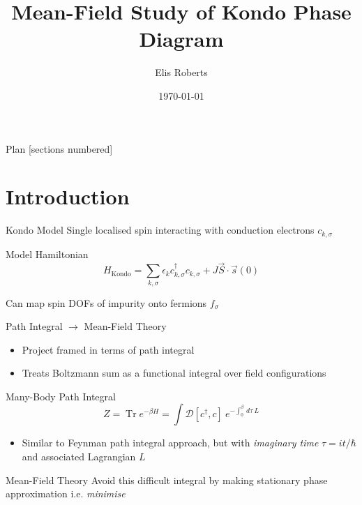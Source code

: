 \documentclass[13pt]{beamer}
\title{Mean-Field Study of Kondo Phase Diagram}
\date{\today}
\author{Elis Roberts} %
\institute{University of Cambridge}
\DeclareMathOperator{\Tr}{Tr}
\begin{document}
  \maketitle

  \begin{frame}{Plan}
  [sections numbered]
  \tableofcontents[hideallsubsections]
  \end{frame}

  \section{Introduction}

  \begin{frame}{Kondo Model}
    Single localised spin interacting with conduction electrons $c^{}_{k,\sigma} $

    \vfill

    \begin{block}{Model Hamiltonian}
    $$ H_{\text{Kondo}}=\sum_{k,\sigma}\epsilon_{k} c_{k,\sigma}^{\dagger}c^{}_{k,\sigma}+J\vec{S}\cdot\vec{s}(0) $$
    \end{block}

  Can map spin \textsc{DOF}s of impurity onto fermions $ f^{}_{\sigma} $

  \end{frame}

  \begin{frame}{Path Integral $ \rightarrow $ Mean-Field Theory}

  \begin{itemize}
    \item Project framed in terms of path integral
    \item Treats Boltzmann sum as a functional integral over field configurations
  \end{itemize}

    \begin{block}{Many-Body Path Integral}
      $$ Z = \Tr{e^{- \beta H}} = \int \mathcal{D} [c^\dagger, c]~e^{-\int_{0}^{\beta} \,d\tau~L} $$
    \end{block}

  \begin{itemize}
    \item Similar to Feynman path integral approach, but with \textit{imaginary time} $ \tau = i t / \hbar $ and associated Lagrangian $ L $
  \end{itemize}

  \begin{block}{Mean-Field Theory}
    Avoid this difficult integral by making stationary phase approximation \hfill i.e. \textit{minimise}
  \end{block}

  \end{frame}
\end{document}
